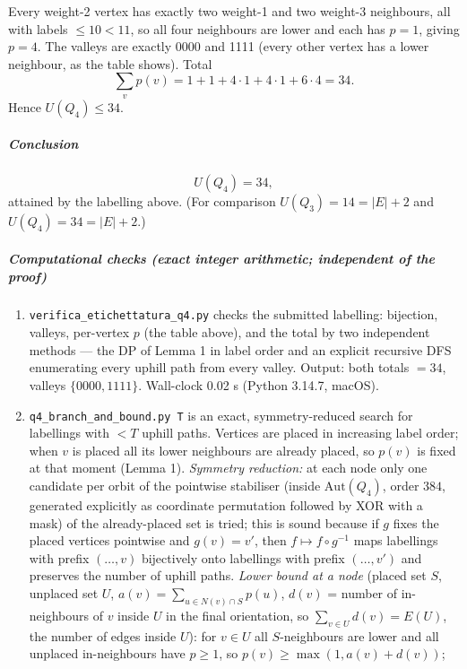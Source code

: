 Every weight-2 vertex has exactly two weight-1 and two weight-3
neighbours, all with labels \(\le10<11\), so all four neighbours are
lower and each has \(p=1\), giving \(p=4\). The valleys are exactly 0000
and 1111 (every other vertex has a lower neighbour, as the table shows).
Total \[\sum_v p(v)=1+1+4\cdot1+4\cdot1+6\cdot4=34 .\] Hence
\(U(Q_4)\le34\).

\subparagraph{Conclusion}\label{conclusion}

\[U(Q_4)=34,\] attained by the labelling above. (For comparison
\(U(Q_3)=14=|E|+2\) and \(U(Q_4)=34=|E|+2\).)

\subparagraph{Computational checks (exact integer arithmetic;
independent of the
proof)}\label{computational-checks-exact-integer-arithmetic-independent-of-the-proof}

\begin{enumerate}
\def\labelenumi{\arabic{enumi}.}
\item
  \texttt{verifica\_etichettatura\_q4.py} checks the submitted
  labelling: bijection, valleys, per-vertex \(p\) (the table above), and
  the total by two independent methods --- the DP of Lemma 1 in label
  order and an explicit recursive DFS enumerating every uphill path from
  every valley. Output: both totals \(=34\), valleys \(\{0000,1111\}\).
  Wall-clock 0.02 s (Python 3.14.7, macOS).
\item
  \texttt{q4\_branch\_and\_bound.py\ T} is an exact, symmetry-reduced
  search for labellings with \(<T\) uphill paths. Vertices are placed in
  increasing label order; when \(v\) is placed all its lower neighbours
  are already placed, so \(p(v)\) is fixed at that moment (Lemma 1).
  \emph{Symmetry reduction:} at each node only one candidate per orbit
  of the pointwise stabiliser (inside \(\mathrm{Aut}(Q_4)\), order
  \(384\), generated explicitly as coordinate permutation followed by
  XOR with a mask) of the already-placed set is tried; this is sound
  because if \(g\) fixes the placed vertices pointwise and \(g(v)=v'\),
  then \(f\mapsto f\circ g^{-1}\) maps labellings with prefix
  \((\dots,v)\) bijectively onto labellings with prefix \((\dots,v')\)
  and preserves the number of uphill paths. \emph{Lower bound at a node}
  (placed set \(S\), unplaced set \(U\),
  \(a(v)=\sum_{u\in N(v)\cap S}p(u)\), \(d(v)\) = number of
  in-neighbours of \(v\) inside \(U\) in the final orientation, so
  \(\sum_{v\in U}d(v)=E(U)\), the number of edges inside \(U\)): for
  \(v\in U\) all \(S\)-neighbours are lower and all unplaced
  in-neighbours have \(p\ge1\), so \(p(v)\ge\max(1,a(v)+d(v))\);

\end{enumerate}
